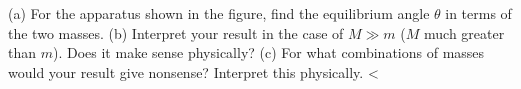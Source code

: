         (a) For the apparatus shown in the figure, find the equilibrium angle $\theta$
        in terms of the two masses.\answercheck\hwendpart
        (b) Interpret your result in the case of $M\gg m$ ($M$ much greater than $m$). Does
        it make sense physically?\hwendpart
        (c) For what combinations of masses would your result give nonsense? Interpret
        this physically.
        <%
